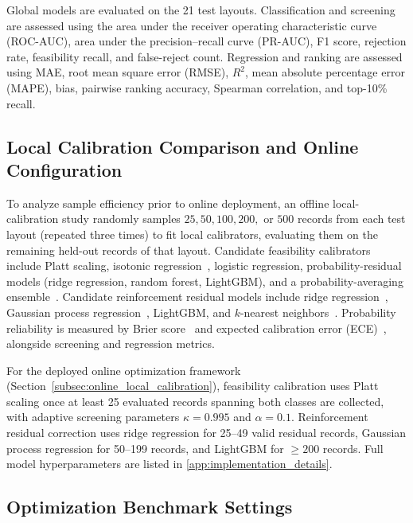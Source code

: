 Global models are evaluated on the 21 test layouts. Classification and screening are assessed using the area under the receiver operating characteristic curve (ROC-AUC), area under the precision--recall curve (PR-AUC), F1 score, rejection rate, feasibility recall, and false-reject count. Regression and ranking are assessed using MAE, root mean square error (RMSE), $R^2$, mean absolute percentage error (MAPE), bias, pairwise ranking accuracy, Spearman correlation, and top-10\% recall.

\subsection{Local Calibration Comparison and Online Configuration}
\label{subsec:local_calibration_settings}

To analyze sample efficiency prior to online deployment, an offline local-calibration study randomly samples $25, 50, 100, 200,$ or $500$ records from each test layout (repeated three times) to fit local calibrators, evaluating them on the remaining held-out records of that layout. Candidate feasibility calibrators include Platt scaling, isotonic regression~\cite{Zadrozny2002}, logistic regression, probability-residual models (ridge regression, random forest, LightGBM), and a probability-averaging ensemble~\cite{Bella2013}. Candidate reinforcement residual models include ridge regression~\cite{Hoerl1970Ridge}, Gaussian process regression~\cite{Rasmussen2006GPML}, LightGBM, and $k$-nearest neighbors~\cite{Cover1967KNN}. Probability reliability is measured by Brier score~\cite{Brier1950} and expected calibration error (ECE)~\cite{Naeini2015}, alongside screening and regression metrics.

For the deployed online optimization framework (Section~\ref{subsec:online_local_calibration}), feasibility calibration uses Platt scaling once at least 25 evaluated records spanning both classes are collected, with adaptive screening parameters $\kappa=0.995$ and $\alpha=0.1$. Reinforcement residual correction uses ridge regression for 25--49 valid residual records, Gaussian process regression for 50--199 records, and LightGBM for $\ge 200$ records. Full model hyperparameters are listed in \ref{app:implementation_details}.

\subsection{Optimization Benchmark Settings}
\label{subsec:optimization_benchmark_settings}

